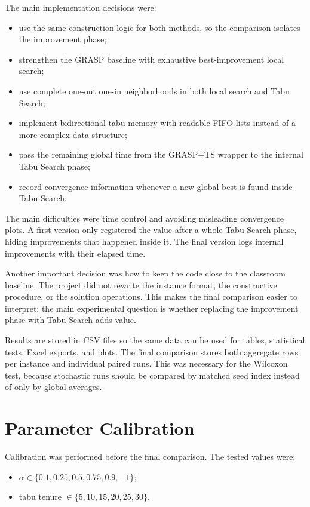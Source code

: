 \documentclass[12pt,a4paper]{article}
\newcommand{\grasp}{GRASP}
\newcommand{\graspTS}{GRASP+TS}
\newcommand{\tabu}{Tabu Search}
\begin{document}
The main implementation decisions were:

\begin{itemize}
    \item use the same construction logic for both methods, so the comparison isolates the improvement phase;
    \item strengthen the \grasp{} baseline with exhaustive best-improvement local search;
    \item use complete one-out one-in neighborhoods in both local search and \tabu{};
    \item implement bidirectional tabu memory with readable FIFO lists instead of a more complex data structure;
    \item pass the remaining global time from the \graspTS{} wrapper to the internal \tabu{} phase;
    \item record convergence information whenever a new global best is found inside \tabu{}.
\end{itemize}

The main difficulties were time control and avoiding misleading convergence plots. A first version only registered the value after a whole \tabu{} phase, hiding improvements that happened inside it. The final version logs internal improvements with their elapsed time.

Another important decision was how to keep the code close to the classroom baseline. The project did not rewrite the instance format, the constructive procedure, or the solution operations. This makes the final comparison easier to interpret: the main experimental question is whether replacing the improvement phase with \tabu{} adds value.

Results are stored in CSV files so the same data can be used for tables, statistical tests, Excel exports, and plots. The final comparison stores both aggregate rows per instance and individual paired runs. This was necessary for the Wilcoxon test, because stochastic runs should be compared by matched seed index instead of only by global averages.

\section{Parameter Calibration}

Calibration was performed before the final comparison. The tested values were:

\begin{itemize}
    \item \(\alpha \in \{0.1, 0.25, 0.5, 0.75, 0.9, -1\}\);
    \item tabu tenure \(\in \{5, 10, 15, 20, 25, 30\}\).
\end{itemize}
\end{document}

